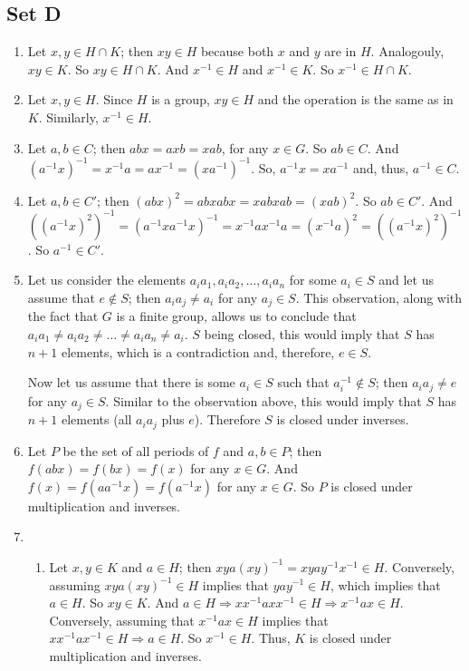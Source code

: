 \documentclass{article}
\begin{document}
\subsection{Set D}
\begin{enumerate}
    \item Let $x, y \in H \cap K$; then $xy \in H$ because both $x$ and $y$ are in $H$. Analogouly, $xy \in K$. So $xy \in H \cap K$. And $x^{-1} \in H$ and $x^{-1} \in K$. So $x^{-1} \in H \cap K$.
    
    \item Let $x, y \in H$. Since $H$ is a group, $xy \in H$ and the operation is the same as in $K$. Similarly, $x^{-1} \in H$.
    
    \item Let $a, b \in C$; then $abx = axb = xab$, for any $x \in G$. So $ab \in C$. And $(a^{-1}x)^{-1} = x^{-1}a = ax^{-1} = (xa^{-1})^{-1}$. So, $a^{-1}x = xa^{-1}$ and, thus, $a^{-1} \in C$.
    
    \item Let $a, b \in C'$; then $(abx)^2 = abxabx = xabxab = (xab)^2$. So $ab \in C'$. And $((a^{-1}x)^2)^{-1} = (a^{-1}xa^{-1}x)^{-1} = x^{-1}ax^{-1}a = (x^{-1}a)^2 = ((a^{-1}x)^2)^{-1}$. So $a^{-1} \in C'$.
    
    \item Let us consider the elements $a_ia_1, a_ia_2, \ldots, a_ia_n$ for some $a_i \in S$ and let us assume that $e \notin S$; then $a_ia_j \ne a_i$ for any $a_j \in S$. This observation, along with the fact that $G$ is a finite group, allows us to conclude that $a_ia_1 \ne a_ia_2 \ne \ldots \ne a_ia_n \ne a_i$. $S$ being closed, this would imply that $S$ has $n + 1$ elements, which is a contradiction and, therefore, $e \in S$.

    Now let us assume that there is some $a_i \in S$ such that $a_i^{-1} \notin S$; then $a_ia_j \ne e$ for any $a_j \in S$. Similar to the observation above, this would imply that $S$ has $n + 1$ elements (all $a_ia_j$ plus $e$). Therefore $S$ is closed under inverses.     
    
    \item Let $P$ be the set of all periods of $f$ and $a, b \in P$; then $f(abx) = f(bx) = f(x)$ for any $x \in G$.
    And $f(x) = f(aa^{-1}x) = f(a^{-1}x)$ for any $x \in G$. So $P$ is closed under multiplication and inverses.
    
    \item
        \begin{enumerate}[label=(\alph*)]
            \item Let $x, y \in K$ and $a \in H$; then $xya(xy)^{-1} = xyay^{-1}x^{-1} \in H$. Conversely, assuming $xya(xy)^{-1} \in H$ implies that $yay^{-1} \in H$, which implies that $a \in H$. So $xy \in K$. And $a \in H \Rightarrow xx^{-1}axx^{-1} \in H \Rightarrow x^{-1}ax \in H$. Conversely, assuming that $x^{-1}ax \in H$ implies that $xx^{-1}ax^{-1} \in H \Rightarrow a \in H$. So $x^{-1} \in H$. Thus, $K$ is closed under multiplication and inverses.
            

\end{enumerate}
\end{enumerate}
\end{document}
